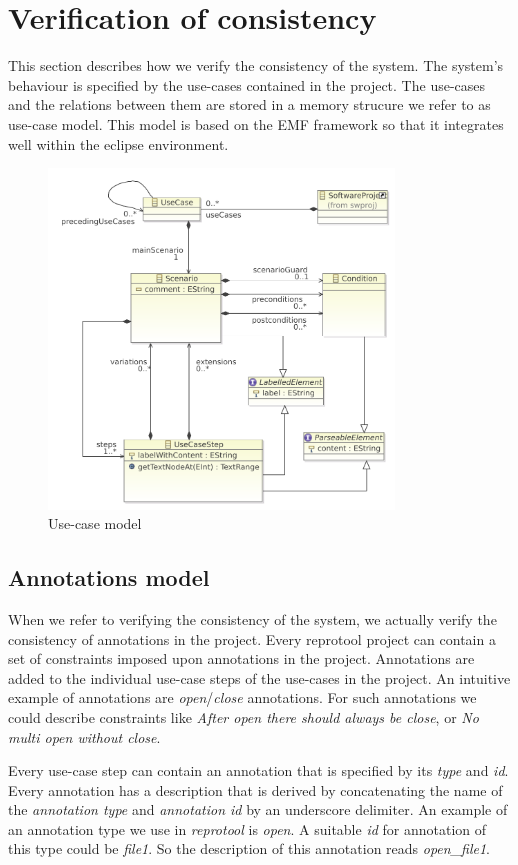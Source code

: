 \section{Verification of consistency}
This section describes how we verify the consistency of the system. The system's behaviour is specified by the use-cases contained
in the project. The use-cases and the relations between them are stored in a memory strucure we refer to as use-case model.
This model is based on the EMF framework so that it integrates well within the eclipse environment.

\begin{figure}[h]
  \centering
  \includegraphics[width=260pt]{images/ReprotoolUCModel}
  \caption{Use-case model}
  \label{fig:ReprotoolUCModel}
\end{figure}

\subsection{Annotations model}

When we refer to verifying the consistency of the system, we actually verify the consistency of annotations in the project. Every
reprotool project can contain a set of constraints imposed upon annotations in the project. Annotations are added to the individual
use-case steps of the use-cases in the project. An intuitive example of annotations are \emph{open}/\emph{close}
annotations. For such annotations we could describe constraints like \emph{After open there should always be close}, or \emph
{No multi open without close}.

Every use-case step can contain an annotation that is specified by its \emph{type} and \emph{id}. Every annotation has a description
that is derived by concatenating the name of the \emph{annotation type} and \emph{annotation id} by an underscore delimiter.
An example of an annotation type we use in \emph{reprotool} is \emph{open}. A suitable \emph{id} for annotation of this type could be
\emph{file1}. So the description of this annotation reads \emph{open\_file1}.

